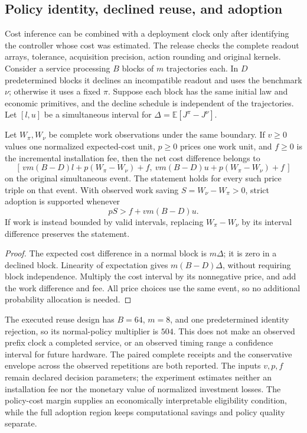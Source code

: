 \subsection{Policy identity, declined reuse, and adoption}
Cost inference can be combined with a deployment clock only after identifying the controller whose cost was estimated. The release checks the complete readout arrays, tolerance, acquisition precision, action rounding and original kernels. Consider a service processing $B$ blocks of $m$ trajectories each. In $D$ predetermined blocks it declines an incompatible readout and uses the benchmark $\nu$; otherwise it uses a fixed $\pi$. Suppose each block has the same initial law and economic primitives, and the decline schedule is independent of the trajectories. Let $[l,u]$ be a simultaneous interval for $\Delta=\mathbb E[J^\pi-J^\nu]$.

\begin{proposition}\label{prop:adoption70}
Let $W_\pi,W_\nu$ be complete work observations under the same boundary. If $v\ge0$ values one normalized expected-cost unit, $p\ge0$ prices one work unit, and $f\ge0$ is the incremental installation fee, then the net cost difference belongs to
\begin{equation}\label{eq:adoption-region70}
 [\,vm(B-D)l+p(W_\pi-W_\nu)+f,
    \ vm(B-D)u+p(W_\pi-W_\nu)+f\,]
\end{equation}
on the original simultaneous event. The statement holds for every such price triple on that event. With observed work saving $S=W_\nu-W_\pi>0$, strict adoption is supported whenever
\[
 pS>f+vm(B-D)u.
\]
If work is instead bounded by valid intervals, replacing $W_\pi-W_\nu$ by its interval difference preserves the statement.
\end{proposition}
\begin{proof}
The expected cost difference in a normal block is $m\Delta$; it is zero in a declined block. Linearity of expectation gives $m(B-D)\Delta$, without requiring block independence. Multiply the cost interval by its nonnegative price, and add the work difference and fee. All price choices use the same event, so no additional probability allocation is needed.
\end{proof}

The executed reuse design has $B=64$, $m=8$, and one predetermined identity rejection, so its normal-policy multiplier is $504$. This does not make an observed prefix clock a completed service, or an observed timing range a confidence interval for future hardware. The paired complete receipts and the conservative envelope across the observed repetitions are both reported. The inputs $v,p,f$ remain declared decision parameters; the experiment estimates neither an installation fee nor the monetary value of normalized investment losses. The policy-cost margin supplies an economically interpretable eligibility condition, while the full adoption region keeps computational savings and policy quality separate.
